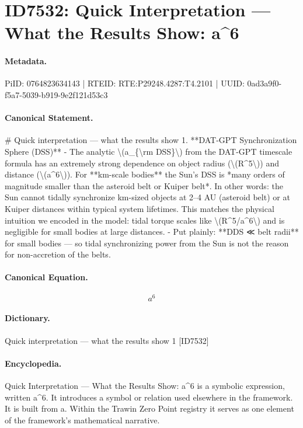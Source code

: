 \section*{ID7532: Quick Interpretation — What the Results Show: a\textasciicircum{}6}
\paragraph{Metadata.}
PiID: 0764823634143 | RTEID: RTE:P29248.4287:T4.2101 | UUID: 0ad3a9f0-f5a7-5039-b919-9e2f121d53c3

\paragraph{Canonical Statement.}
\# Quick interpretation — what the results show 1. **DAT-GPT Synchronization Sphere (DSS)** - The analytic \textbackslash{}(a\_\{\textbackslash{}rm DSS\}\textbackslash{}) from the DAT-GPT timescale formula has an extremely strong dependence on object radius (\textbackslash{}(R\textasciicircum{}5\textbackslash{})) and distance (\textbackslash{}(a\textasciicircum{}6\textbackslash{})). For **km-scale bodies** the Sun’s DSS is *many orders of magnitude smaller than the asteroid belt or Kuiper belt*. In other words: the Sun cannot tidally synchronize km-sized objects at 2–4 AU (asteroid belt) or at Kuiper distances within typical system lifetimes. This matches the physical intuition we encoded in the model: tidal torque scales like \textbackslash{}(R\textasciicircum{}5/a\textasciicircum{}6\textbackslash{}) and is negligible for small bodies at large distances. - Put plainly: **DDS ≪ belt radii** for small bodies — so tidal synchronizing power from the Sun is not the reason for non-accretion of the belts.

\paragraph{Canonical Equation.}
\[
a^6
\]

\paragraph{Dictionary.}
Quick interpretation — what the results show 1 [ID7532]

\paragraph{Encyclopedia.}
Quick Interpretation — What the Results Show: a\textasciicircum{}6 is a symbolic expression, written a\textasciicircum{}6. It introduces a symbol or relation used elsewhere in the framework. It is built from a. Within the Trawin Zero Point registry it serves as one element of the framework's mathematical narrative.
